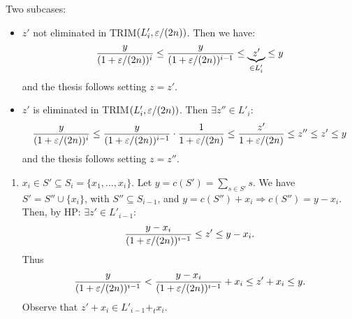 Two subcases:
\begin{itemize}
\item[1.a] $z'$ not eliminated in TRIM$(L'_i,\varepsilon/(2n))$. Then we have:
\[\frac y{(1+\varepsilon/(2n))^i}\leq\frac y{(1+\varepsilon/(2n))^{i-1}}\leq\underbrace{z'}_{\in L'_i}\leq y\]
and the thesis follows setting $z=z'$.
\item[1.b] $z'$ is eliminated in TRIM$(L'_i,\varepsilon/(2n))$. Then $\exists z''\in L'_i$:
\[\frac y{(1+\varepsilon/(2n))^i}
\leq\frac y{(1+\varepsilon/(2n))^{i-1}}\cdot\frac1{1+\varepsilon/(2n)}
\leq\frac{z'}{1+\varepsilon/(2n)}\leq z''\leq z'\leq y\]
and the thesis follows setting $z=z''$.
\end{itemize}
\begin{enumerate}[start=2]
\item $x_i\in S'\subseteq S_i=\{x_1,\ldots,x_i\}$. Let $y=c(S')=\sum_{s\in S'}s$.
We have $S'=S''\cup\{x_i\}$, with $S''\subseteq S_{i-1}$, and
$y=c(S'')+x_i\Rightarrow c(S'')=y-x_i$.
Then, by HP: $\exists z'\in L'_{i-1}$:
\[\frac{y-x_i}{(1+\varepsilon/(2n))^{i-1}}\leq z'\leq y-x_i.\]
Thus
\[\frac y{(1+\varepsilon/(2n))^{i-1}}
<\frac{y-x_i}{(1+\varepsilon/(2n))^{i-1}}+x_i\leq z'+x_i\leq y.\]
Observe that $z'+x_i\in L'_{i-1}+_t x_i$.
\end{enumerate}
